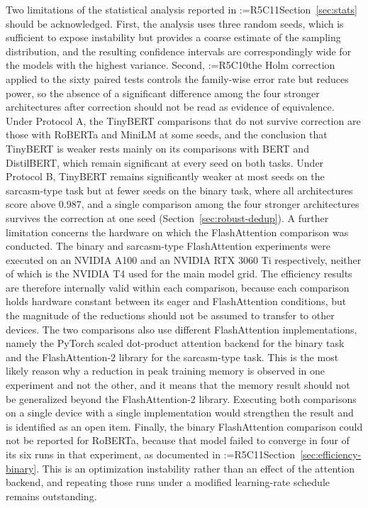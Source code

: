 \documentclass[a4paper,fleqn]{cas-sc}
\makeatletter
\newif\iftracked
\newcommand{\rv@setcolour}[1]{%
  \IfStrEq{#1}{R7C7}{\color{rvEdit}}{%
    \IfSubStr{#1}{R5}{\IfSubStr{#1}{R7}{\color{rvBoth}}{\color{rvFive}}}{\color{rvSeven}}}}
\newcommand{\rv@tag}[1]{\textsuperscript{\sffamily\bfseries\scriptsize[\StrSubstitute{#1}{,}{, }]}\,}
\newcommand{\rv@recordone}[1]{%
  \edef\rv@i{#1}%
  \ifcsdef{rv@n@\rv@i}{}{\csgdef{rv@n@\rv@i}{0}}%
  \csxdef{rv@n@\rv@i}{\the\numexpr\csuse{rv@n@\rv@i}+1\relax}%
  \begingroup\edef\@currentlabel{\rv@i}\label{rv:\rv@i:\csuse{rv@n@\rv@i}}\endgroup}
\newcommand{\rv@record}[1]{\@for\rv@id:=#1\do{\expandafter\rv@recordone\expandafter{\rv@id}}}
\DeclareRobustCommand{\rcrep}[3]{\rv@record{#1}\iftracked{\rv@setcolour{#1}\rv@tag{#1}\rv@strike{#2} #3}\else#3\fi}
\makeatother
\begin{document}
Two limitations of the statistical analysis reported in \rcrep{R5C11}{Section 6.1}{Section~\ref{sec:stats}} should be acknowledged. First, the analysis uses three random seeds, which is sufficient to expose instability but provides a coarse estimate of the sampling distribution, and the resulting confidence intervals are correspondingly wide for the models with the highest variance. Second, \rcrep{R5C10}{no correction for multiple comparisons was applied across the sixty paired tests, so individual $p$-values close to the significance threshold should be interpreted with caution. This does not affect the principal statistical conclusion, because the comparisons involving TinyBERT are significant by several orders of magnitude, and the comparisons among the remaining four architectures are non-significant and would remain so under any correction.}{the Holm correction applied to the sixty paired tests controls the family-wise error rate but reduces power, so the absence of a significant difference among the four stronger architectures after correction should not be read as evidence of equivalence. Under Protocol A, the TinyBERT comparisons that do not survive correction are those with RoBERTa and MiniLM at some seeds, and the conclusion that TinyBERT is weaker rests mainly on its comparisons with BERT and DistilBERT, which remain significant at every seed on both tasks. Under Protocol B, TinyBERT remains significantly weaker at most seeds on the sarcasm-type task but at fewer seeds on the binary task, where all architectures score above 0.987, and a single comparison among the four stronger architectures survives the correction at one seed (Section~\ref{sec:robust-dedup}).} A further limitation concerns the hardware on which the FlashAttention comparison was conducted. The binary and sarcasm-type FlashAttention experiments were executed on an NVIDIA A100 and an NVIDIA RTX 3060 Ti respectively, neither of which is the NVIDIA T4 used for the main model grid. The efficiency results are therefore internally valid within each comparison, because each comparison holds hardware constant between its eager and FlashAttention conditions, but the magnitude of the reductions should not be assumed to transfer to other devices. The two comparisons also use different FlashAttention implementations, namely the PyTorch scaled dot-product attention backend for the binary task and the FlashAttention-2 library for the sarcasm-type task. This is the most likely reason why a reduction in peak training memory is observed in one experiment and not the other, and it means that the memory result should not be generalized beyond the FlashAttention-2 library. Executing both comparisons on a single device with a single implementation would strengthen the result and is identified as an open item. Finally, the binary FlashAttention comparison could not be reported for RoBERTa, because that model failed to converge in four of its six runs in that experiment, as documented in \rcrep{R5C11}{Section 6.1}{Section~\ref{sec:efficiency-binary}}. This is an optimization instability rather than an effect of the attention backend, and repeating those runs under a modified learning-rate schedule remains outstanding.
\end{document}
